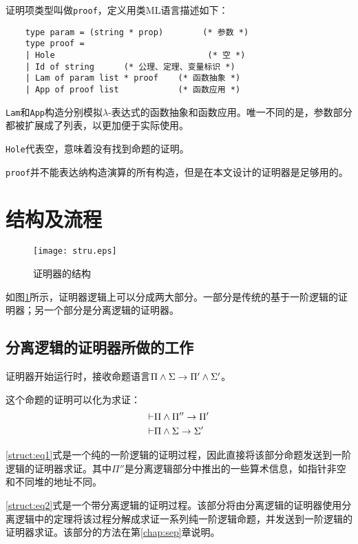 证明项类型叫做\texttt{proof}，定义用类ML语言描述如下：
\begin{verbatim}
    type param = (string * prop)        (* 参数 *)
    type proof =
    | Hole                               (* 空 *)
    | Id of string      (* 公理、定理、变量标识 *)
    | Lam of param list * proof    (* 函数抽象 *)
    | App of proof list            (* 函数应用 *)
\end{verbatim}

\texttt{Lam}和\texttt{App}构造分别模拟$\lambda$-表达式的函数抽象和函数应用。唯一不同的是，参数部分都被扩展成了列表，以更加便于实际使用。

\texttt{Hole}代表空，意味着没有找到命题的证明。

\texttt{proof}并不能表达纳构造演算的所有构造，但是在本文设计的证明器是足够用的。

\section{结构及流程}

\begin{figure}[!htbp]
  \centering
  \texttt{[image: stru.eps]}
  \caption{证明器的结构}
  \label{struct:fig}
\end{figure}

如图\ref{struct:fig}所示，证明器逻辑上可以分成两大部分。一部分是传统的基于一阶逻辑的证明器；另一个部分是分离逻辑的证明器。

\subsection{分离逻辑的证明器所做的工作}
证明器开始运行时，接收命题语言$\Pi \land \Sigma \rightarrow \Pi' \land \Sigma'$。

这个命题的证明可以化为求证：
\begin{eqnarray}
  \vdash & \Pi \land \Pi'' \rightarrow \Pi' \label{struct:eq1}\\
  \vdash & \Pi \land \Sigma \rightarrow \Sigma' \label{struct:eq2}
\end{eqnarray}

\ref{struct:eq1}式是一个纯的一阶逻辑的证明过程，因此直接将该部分命题发送到一阶逻辑的证明器求证。其中$\Pi''$是分离逻辑部分中推出的一些算术信息，如指针非空和不同堆的地址不同。

\ref{struct:eq2}式是一个带分离逻辑的证明过程。该部分将由分离逻辑的证明器使用分离逻辑中的定理将该过程分解成求证一系列纯一阶逻辑命题，并发送到一阶逻辑的证明器求证。该部分的方法在第\ref{chap:sep}章说明。

